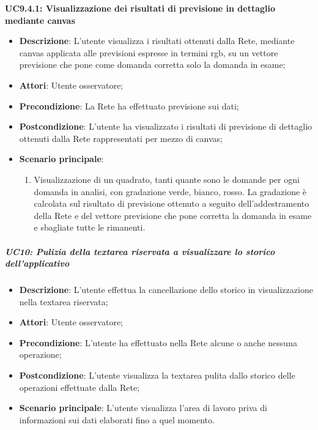 \textbf{UC9.4.1: Visualizzazione dei risultati di previsione in dettaglio mediante canvas}\mbox{}
\label{UC9.4.1: Visualizzazione dei risultati di previsione in dettaglio mediante canvas}
\noindent
\begin{itemize}
\item \textbf{Descrizione}: L'utente visualizza i risultati ottenuti dalla Rete, mediante canvas applicata alle previsioni espresse in termini rgb, su un vettore previsione che pone come domanda corretta solo la domanda in esame;
\item \textbf{Attori}: Utente osservatore;
\item \textbf{Precondizione}: La Rete ha effettuato previsione sui dati;
\item \textbf{Postcondizione}: L'utente ha visualizzato i risultati di previsione di dettaglio ottenuti dalla Rete rappresentati per mezzo di canvas; 
\item \textbf{Scenario principale}:
\begin{enumerate}
\item Visualizzazione di un quadrato, tanti quante sono le domande per ogni domanda in analisi, con gradazione verde, bianco, rosso. La gradazione \`e calcolata sul risultato di previsione ottenuto a seguito dell'addestramento della Rete e del vettore previsione che pone corretta la domanda in esame e sbagliate tutte le rimanenti.
\end{enumerate}
\end{itemize}

\subparagraph{UC10: Pulizia della textarea riservata a visualizzare lo storico dell'applicativo}\mbox{}
\label{UC10: Pulizia della textarea riservata a visualizzare lo storico dell'applicativo}
\noindent
\begin{itemize}
\item \textbf{Descrizione}: L'utente effettua la cancellazione dello storico in visualizzazione nella textarea riservata;
\item \textbf{Attori}: Utente osservatore;
\item \textbf{Precondizione}: L'utente ha effettuato nella Rete alcune o anche nessuna operazione;
\item \textbf{Postcondizione}: L'utente visualizza la textarea pulita dallo storico delle operazioni effettuate dalla Rete;
\item \textbf{Scenario principale}: L'utente visualizza l'area di lavoro priva di informazioni sui dati elaborati fino a quel momento.
\end{itemize}


